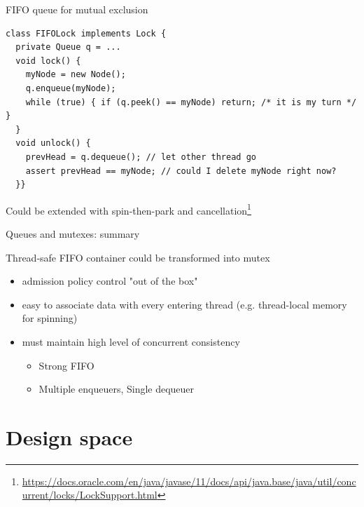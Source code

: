 \begin{frame}[fragile]{FIFO queue for mutual exclusion}

\begin{verbatim}
class FIFOLock implements Lock {
  private Queue q = ...
  void lock() {
    myNode = new Node();
    q.enqueue(myNode);
    while (true) { if (q.peek() == myNode) return; /* it is my turn */ }            
  }
  void unlock() {
    prevHead = q.dequeue(); // let other thread go
    assert prevHead == myNode; // could I delete myNode right now?
  }}
\end{verbatim}

\pause

Could be extended with spin-then-park and cancellation\footnote<2->{\tiny\url{https://docs.oracle.com/en/java/javase/11/docs/api/java.base/java/util/concurrent/locks/LockSupport.html}}

\end{frame}


\begin{frame}[fragile]{Queues and mutexes: summary}

Thread-safe FIFO container could be transformed into mutex
\begin{itemize}
  \item admission policy control "out of the box"
  \item easy to associate data with every entering thread (e.g. thread-local memory for spinning)
  \item must maintain high level of concurrent consistency
  \begin{itemize}
      \item Strong FIFO
      \item Multiple enqueuers, Single dequeuer
  \end{itemize}  
\end{itemize}
\end{frame}


\section{Design space}
\showTOC

